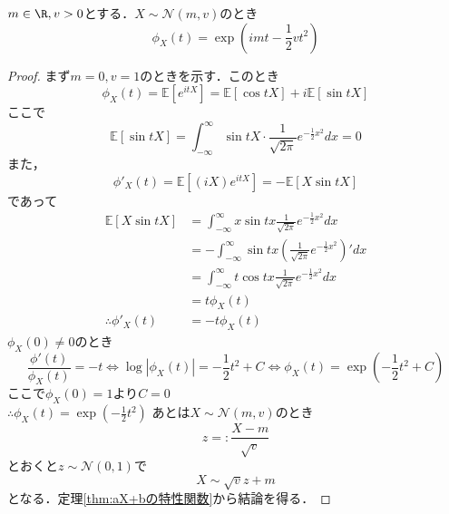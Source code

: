     $m\in \R, v> 0$とする．$X\sim \mathcal{N}(m, v)$のとき
\begin{equation}
    \phi_X(t)= \exp{\left(imt- \frac{1}{2}vt^2\right)}
\end{equation}
\begin{proof}
    まず$m= 0, v= 1$のときを示す．このとき
\begin{equation}
    \phi_X(t)= \mathbb{E}[e^{itX}]= \mathbb{E}[\cos{tX}]+ i\mathbb{E}[\sin{tX}]
\end{equation}
    ここで
\begin{equation}
    \mathbb{E}[\sin{tX}]= \int_{-\infty}^\infty \sin{tX}\cdot \frac{1}{\sqrt{2\pi}}e^{-\frac{1}{2}x^2}dx= 0
\end{equation}
    また，
\begin{equation}
    \phi'_X(t)= \mathbb{E}[(iX)e^{itX}]= -\mathbb{E}[X\sin{tX}]
\end{equation}
    であって
\begin{align}
    \mathbb{E}[X\sin{tX}]
    &= \int_{-\infty}^\infty x\sin{tx}\frac{1}{\sqrt{2\pi}}e^{-\frac{1}{2}x^2}dx\\
    &= -\int_{-\infty}^\infty \sin{tx}\left(\frac{1}{\sqrt{2\pi}}e^{-\frac{1}{2}x^2}\right)'dx\\
    &= \int_{-\infty}^\infty t\cos{tx}\frac{1}{\sqrt{2\pi}}e^{-\frac{1}{2}x^2}dx\\
    &= t\phi_X(t)\\
    \therefore \phi'_X(t)&= -t\phi_X(t)
\end{align}
    $\phi_X(0)\ne 0$のとき
\begin{equation}
    \frac{\phi'(t)}{\phi_X(t)}= -t
    \iff \log|\phi_X(t)|= -\frac{1}{2}t^2+ C
    \iff \phi_X(t)= \exp{\left(-\frac{1}{2}t^2+ C\right)}
\end{equation}
    ここで$\phi_X(0)= 1$より$C= 0$\\
    $\therefore \phi_X(t)= \exp{\left(-\frac{1}{2}t^2\right)}$
    あとは$X\sim \mathcal{N}(m, v)$のとき
\begin{equation}
    z=: \frac{X- m}{\sqrt{v}}
\end{equation}
    とおくと$z\sim \mathcal{N}(0, 1)$で
\begin{equation}
    X\sim \sqrt{v}z+ m
\end{equation}
    となる．定理\ref{thm:aX+bの特性関数}から結論を得る．
\end{proof}